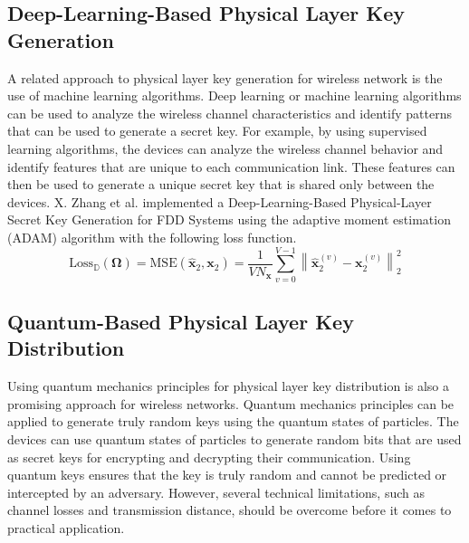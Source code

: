 \subsection{Deep-Learning-Based Physical Layer Key Generation}
A related approach to physical layer key generation for wireless network is the use of machine learning algorithms. Deep learning or machine learning algorithms can be used to analyze the wireless channel characteristics and identify patterns that can be used to generate a secret key. For example, by using supervised learning algorithms, the devices can analyze the wireless channel behavior and identify features that are unique to each communication link. These features can then be used to generate a unique secret key that is shared only between the devices. X. Zhang et al. implemented a Deep-Learning-Based Physical-Layer Secret Key Generation for FDD Systems using the adaptive moment estimation (ADAM) algorithm with the following loss function\cite{9526766}. 
\begin{equation} {\mathrm{ Loss}}_{\mathbb {D}}\left ({\boldsymbol {\Omega }}\right) = {\mathrm{ MSE}}\left ({\widehat {\mathbf {x}}_{2}, \mathbf {x}_{2}}\right)=\frac {1}{VN_{\mathbf {x}}}\sum _{v=0}^{V-1}\left \|{\widehat {\mathbf {x}}_{2}^{\left ({v}\right)} -\mathbf {x}_{2}^{\left ({v}\right)}}\right \|_{2}^{2}\end{equation} 
\subsection{Quantum-Based Physical Layer Key Distribution}
Using quantum mechanics principles for physical layer key distribution is also a promising approach for wireless networks. Quantum mechanics principles can be applied to generate truly random keys using the quantum states of particles. The devices can use quantum states of particles to generate random bits that are used as secret keys for encrypting and decrypting their communication. Using quantum keys ensures that the key is truly random and cannot be predicted or intercepted by an adversary. However, several technical limitations, such as channel losses and transmission distance, should be overcome before it comes to practical application.

